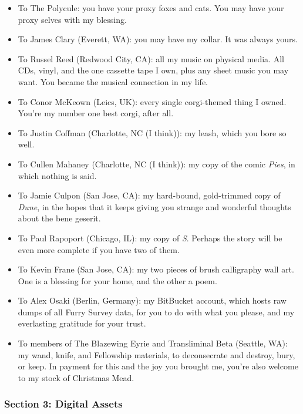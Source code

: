 \documentclass[oneside]{memoir}
\begin{document}
\begin{enumerate}
  \begin{itemize}
  \tightlist
  \item
    To The Polycule: you have your proxy foxes and cats. You may have your proxy selves with my blessing.
  \item
    To James Clary (Everett, WA): you may have my collar. It was always yours.
  \item
    To Russel Reed (Redwood City, CA): all my music on physical media. All CDs, vinyl, and the one cassette tape I own, plus any sheet music you may want. You became the musical connection in my life.
  \item
    To Conor McKeown (Leics, UK): every single corgi-themed thing I owned. You're my number one best corgi, after all.
  \item
    To Justin Coffman (Charlotte, NC (I think)): my leash, which you bore so well.
  \item
    To Cullen Mahaney (Charlotte, NC (I think)): my copy of the comic \emph{Pies}, in which nothing is said.
  \item
    To Jamie Culpon (San Jose, CA): my hard-bound, gold-trimmed copy of \emph{Dune}, in the hopes that it keeps giving you strange and wonderful thoughts about the bene geserit.
  \item
    To Paul Rapoport (Chicago, IL): my copy of \emph{S}. Perhaps the story will be even more complete if you have two of them.
  \item
    To Kevin Frane (San Jose, CA): my two pieces of brush calligraphy wall art. One is a blessing for your home, and the other a poem.
  \item
    To Alex Osaki (Berlin, Germany): my BitBucket account, which hosts raw dumps of all Furry Survey data, for you to do with what you please, and my everlasting gratitude for your trust.
  \item
    To members of The Blazewing Eyrie and Transliminal Beta (Seattle, WA): my wand, knife, and Fellowship materials, to deconsecrate and destroy, bury, or keep. In payment for this and the joy you brought me, you're also welcome to my stock of Christmas Mead.
  \end{itemize}
\end{enumerate}

\subsubsection*{Section 3: Digital Assets}\label{section-3-digital-assets}
\end{document}
